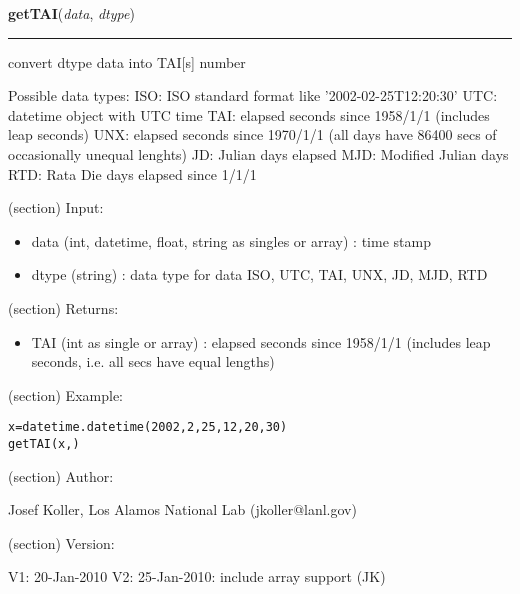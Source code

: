     \label{spacepy:ticktock:getTAI}

    \vspace{0.5ex}

\hspace{.8\funcindent}\begin{boxedminipage}{\funcwidth}

    \raggedright \textbf{getTAI}(\textit{data}, \textit{dtype})

    \vspace{-1.5ex}

    \rule{\textwidth}{0.5\fboxrule}
\setlength{\parskip}{2ex}
    convert dtype data into TAI[s] number

    Possible data types: ISO: ISO standard format like 
    '2002-02-25T12:20:30' UTC: datetime object with UTC time TAI: elapsed 
    seconds since 1958/1/1 (includes leap seconds) UNX: elapsed seconds 
    since 1970/1/1 (all days have 86400 secs of occasionally unequal 
    lenghts) JD: Julian days elapsed MJD: Modified Julian days RTD: Rata 
    Die days elapsed since 1/1/1

    (section) Input:

      \begin{itemize}
      \setlength{\parskip}{0.6ex}
        \item data (int, datetime, float, string as singles or array) : time 
          stamp

        \item dtype (string) : data type for data ISO, UTC, TAI, UNX, JD, MJD, 
          RTD

      \end{itemize}

    (section) Returns:

      \begin{itemize}
      \setlength{\parskip}{0.6ex}
        \item TAI (int as single or array) : elapsed seconds since 1958/1/1 
          (includes leap seconds, i.e. all secs have equal lengths)

      \end{itemize}

    (section) Example:

\begin{alltt}
\pysrcprompt{{\textgreater}{\textgreater}{\textgreater} }x=datetime.datetime(2002,2,25,12,20,30)
\pysrcprompt{{\textgreater}{\textgreater}{\textgreater} }getTAI(x, )
\end{alltt}
    (section) Author:

      Josef Koller, Los Alamos National Lab (jkoller@lanl.gov)

    (section) Version:

      V1: 20-Jan-2010 V2: 25-Jan-2010: include array support (JK)

\setlength{\parskip}{1ex}
    \end{boxedminipage}

